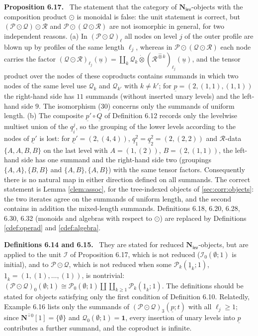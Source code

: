 \documentclass[12pt]{article}
\theoremstyle{plain}
\theoremstyle{definition}
\theoremstyle{remark}
\newcommand{\Cal}[1]{\mathcal{#1}}
\newcommand{\Nl}{\mathbf{N}_{\mathsf{lev}}}
\newcommand{\Ncirc}[1]{\mathbf{N}^{\hat{\circ}#1}}
\newcommand{\circdot}{\odot}
\newcommand{\tensorhat}{\hat{\otimes}}
\newcommand{\tensordot}{\dot{\otimes}}
\newcommand{\corr}[1]{\par\smallskip\noindent\textbf{#1.}\ }
\begin{document}
\corr{Proposition 6.17} The statement that the category of $\Nl$-objects with the composition product $\circdot$ is monoidal is false: the unit statement is correct, but $(\Cal P\circdot\Cal Q)\circdot\Cal R$ and $\Cal P\circdot(\Cal Q\circdot\Cal R)$ are not isomorphic in general, for two independent reasons. (a) In $(\Cal P\circdot\Cal Q)_\ell$ all nodes on level $j$ of the outer profile are blown up by profiles of the same length $\ell_j$, whereas in $\Cal P\circdot(\Cal Q\circdot\Cal R)$ each node carries the factor $(\Cal Q\circdot\Cal R)_{\ell_j}(\underline u)=\coprod_k\Cal Q_k\tensordot(\Cal R^{\tensorhat k})_{\ell_j}(\underline u)$, and the tensor product over the nodes of these coproducts contains summands in which two nodes of the same level use $\Cal Q_k$ and $\Cal Q_{k'}$ with $k\neq k'$; for $\underline p=(2,(1,1),(1,1))$ the right-hand side has $11$ summands (without inserted unary levels) and the left-hand side $9$. The isomorphism (30) concerns only the summands of uniform length. (b) The composite $\underline p'\circ\underline Q$ of Definition 6.12 records only the levelwise multiset union of the $\underline q^j_i$, so the grouping of the lower levels according to the nodes of $\underline p'$ is lost: for $\underline p'=(2,(4,4))$, $\underline q^2_1=\underline q^2_2=(2,(2,2))$ and $\Cal R$-data $\{A,A,B,B\}$ on the last level with $A=(1,(2))$, $B=(2,(1,1))$, the left-hand side has one summand and the right-hand side two (groupings $\{A,A\},\{B,B\}$ and $\{A,B\},\{A,B\}$) with the same tensor factors. Consequently there is no natural map in either direction defined on all summands. The correct statement is Lemma \ref{clem:assoc}, for the tree-indexed objects of \ref{sec:corr:objects}: the two iterates agree on the summands of uniform length, and the second contains in addition the mixed-length summands. Definitions 6.18, 6.20, 6.28, 6.30, 6.32 (monoids and algebras with respect to $\circdot$) are replaced by Definitions \ref{cdef:operad} and \ref{cdef:algebra}.

\corr{Definitions 6.14 and 6.15} They are stated for reduced $\Nl$-objects, but are applied to the unit $\Cal I$ of Proposition 6.17, which is not reduced ($\Cal I_0(\emptyset;1)$ is initial), and to $\Cal P\circdot\Cal Q$, which is not reduced when some $\Cal P_k(\underline1_k;1)$, $\underline1_k=(1,(1),\dots,(1))$, is nontrivial: $(\Cal P\circdot\Cal Q)_0(\emptyset;1)\cong\Cal P_0(\emptyset;1)\amalg\coprod_{k\geq1}\Cal P_k(\underline1_k;1)$. The definitions should be stated for objects satisfying only the first condition of Definition 6.10. Relatedly, Example 6.16 lists only the summands of $(\Cal P\circdot\Cal Q)_3(\underline p;t)$ with all $\ell_j\geq1$; since $\Ncirc0[1]=\{\emptyset\}$ and $\Cal Q_0(\emptyset;1)=\mathbf1$, every insertion of unary levels into $\underline p$ contributes a further summand, and the coproduct is infinite.
\end{document}
